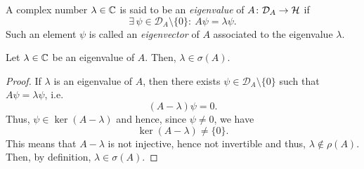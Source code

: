 
\begin{definition}
A complex number $\lambda\in\mathbb{C}$ is said to be an \emph{eigenvalue} of $A\colon\mathcal{D}_A\to\mathcal{H}$ if
\begin{equation*}
\exists\, \psi \in \mathcal{D}_A\setminus \{0\} : \ A\psi = \lambda \psi.
\end{equation*}
Such an element $\psi$ is called an \emph{eigenvector} of $A$ associated to the eigenvalue $\lambda$.
\end{definition}

\begin{corollary}
Let $\lambda\in\mathbb{C}$ be an eigenvalue of $A$. Then, $\lambda\in\sigma(A)$.
\end{corollary}

\begin{proof}
If $\lambda$ is an eigenvalue of $A$, then there exists $\psi\in\mathcal{D}_A\setminus\{0\}$ such that $A\psi = \lambda \psi$, i.e.\ \begin{equation*}
(A-\lambda)\psi = 0.
\end{equation*}
Thus, $\psi\in\ker(A-\lambda)$ and hence, since $\psi\neq 0$, we have
\begin{equation*}
\ker(A-\lambda)\neq\{0\}.
\end{equation*}
This means that $A-\lambda$ is not injective, hence not invertible and thus, $\lambda\notin\rho(A)$. Then, by definition, $\lambda\in\sigma(A)$.
\end{proof}

